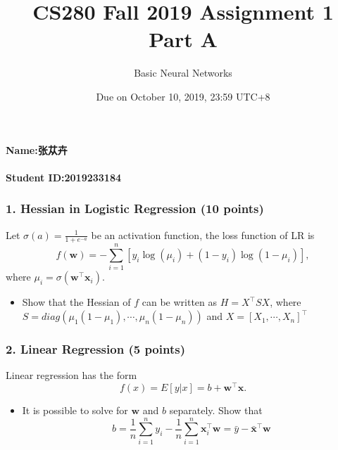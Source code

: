 \documentclass[12pt]{article}%
\begin{document}
\title{CS280 Fall 2019 Assignment 1 \\ Part A}
\author{Basic Neural Networks}
\date{Due on October 10, 2019, 23:59 UTC+8}
\maketitle

\paragraph{Name:张苁卉}

\paragraph{Student ID:2019233184}

\newpage


\subsubsection*{1. Hessian in Logistic Regression (10 points)}
Let $\sigma(a)=\frac{1}{1+e^{-a}}$ be an activation function, the loss function of LR is  \[f(\mathbf{w})=-\sum_{i=1}^{n}[y_i\log(\mu_i)+(1-y_i)\log(1-\mu_i)],\] where $\mu_i=\sigma(\mathbf{w}^\intercal\mathbf{x}_i)$. 
\begin{itemize}
	\item Show that the Hessian of $f$ can be written as $H=X^\intercal S X$, where $S=diag(\mu_1(1-\mu_1),\cdots, \mu_n(1-\mu_n))$ and $X = [X_1,\cdots, X_n]^\intercal$
\end{itemize}


\newpage


\subsubsection*{2. Linear Regression (5 points)}
Linear regression has the form \[f(x)=E[y|x] = b + \mathbf{w}^\intercal \mathbf{x}.\]  
\begin{itemize}
	\item It is possible to solve for $\mathbf{w}$ and $b$ separately. Show that 
	\[b = \frac{1}{n}\sum_{i=1}^n y_i -\frac{1}{n}\sum_{i=1}^n \mathbf{x}_i^\intercal \mathbf{w} = \bar{y} - \bar{\mathbf{x}}^\intercal \mathbf{w}\]
\end{itemize}


\newpage


\end{document}

